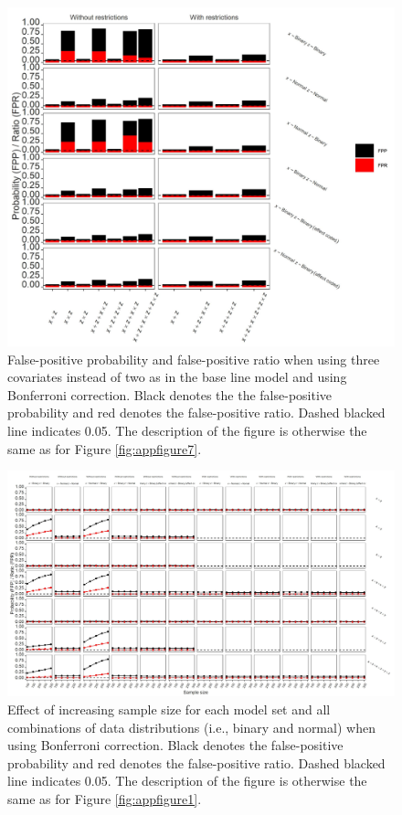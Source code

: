 \begin{figure}[ht!]
\includegraphics[width=1\textwidth]{R/Analysis/Result/Figures/Figure1CSIBon.jpeg}
\centering
\caption{False-positive probability and false-positive ratio when using three covariates instead of two as in the base line model and using Bonferroni correction. Black denotes the the false-positive probability and red denotes the false-positive ratio. Dashed blacked line indicates 0.05. The description of the figure is otherwise the same as for Figure \ref{fig:appfigure7}.
}
\label{fig:appfigure11}
\end{figure}


\begin{landscape}
\begin{figure}[ht!]
\includegraphics[scale=0.75]{R/Analysis/Result/Figures/Figure1DSIBon.jpeg}
\centering
\caption{Effect of increasing sample size for each model set and all combinations of data distributions (i.e., binary and normal) when using Bonferroni correction. Black denotes the false-positive probability and red denotes the false-positive ratio. Dashed blacked line indicates 0.05. The description of the figure is otherwise the same as for Figure \ref{fig:appfigure1}.}
\label{fig:appfigure12}
\end{figure}
\end{landscape}

